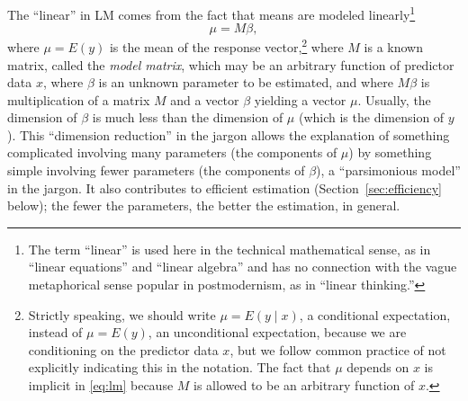 \documentclass[11pt]{article}
\begin{document}
The ``linear'' in LM comes from the fact that means are modeled
linearly\footnote{The term ``linear'' is used here in the technical
mathematical sense, as in ``linear equations'' and ``linear algebra''
and has no connection with the vague metaphorical sense popular
in postmodernism, as in ``linear thinking.''}
\begin{equation} \label{eq:lm}
   \mu = M \beta,
\end{equation}
where $\mu = E(y)$ is the mean of the response vector,\footnote{Strictly
speaking, we should write $\mu = E(y \mid x)$, a conditional
expectation, instead of $\mu = E(y)$, an unconditional expectation,
because we are conditioning on the predictor data $x$, but we follow
common practice of not explicitly indicating this in the notation.  The fact
that $\mu$ depends on $x$ is implicit in \eqref{eq:lm} because $M$ is allowed
to be an arbitrary function of $x$.}
where $M$ is a known matrix,
called the \emph{model matrix}, which may be an arbitrary function of
predictor data $x$, where $\beta$ is an unknown parameter to be estimated,
and where $M \beta$ is multiplication of a matrix $M$ and a vector $\beta$
yielding a vector $\mu$.
Usually, the dimension of $\beta$ is much less than the dimension of $\mu$
(which is the dimension of $y$).  This ``dimension reduction'' in the jargon
allows the explanation of something complicated involving many parameters
(the components of $\mu$) by something simple involving fewer parameters
(the components of $\beta$), a ``parsimonious model'' in the jargon.
It also contributes to efficient estimation (Section~\ref{sec:efficiency}
below); the fewer the parameters, the
better the estimation, in general.
\end{document}
